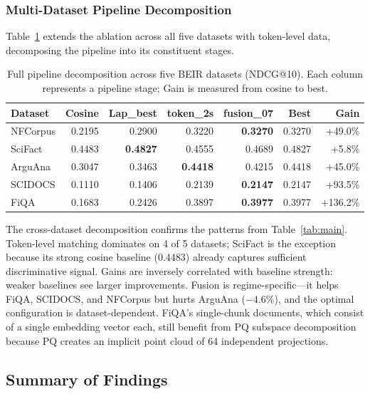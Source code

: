 \documentclass[review,1p]{elsarticle}
\begin{document}
\subsubsection{Multi-Dataset Pipeline Decomposition}
\label{subsubsec:multi-dataset}

Table~\ref{tab:decomposition} extends the ablation across all five datasets with token-level data, decomposing the pipeline into its constituent stages.

\begin{table}[ht]
\centering
\caption{Full pipeline decomposition across five BEIR datasets (NDCG@10). Each column represents a pipeline stage; Gain is measured from cosine to best.}
\label{tab:decomposition}
\begin{tabular}{lrrrrr|r}
\toprule
Dataset & Cosine & Lap\_best & token\_2s & fusion\_07 & \textbf{Best} & \textbf{Gain} \\
\midrule
NFCorpus & 0.2195 & 0.2900 & 0.3220 & \textbf{0.3270} & 0.3270 & +49.0\% \\
SciFact & 0.4483 & \textbf{0.4827} & 0.4555 & 0.4689 & 0.4827 & +5.8\% \\
ArguAna & 0.3047 & 0.3463 & \textbf{0.4418} & 0.4215 & 0.4418 & +45.0\% \\
SCIDOCS & 0.1110 & 0.1406 & 0.2139 & \textbf{0.2147} & 0.2147 & +93.5\% \\
FiQA & 0.1683 & 0.2426 & 0.3897 & \textbf{0.3977} & 0.3977 & +136.2\% \\
\bottomrule
\end{tabular}
\end{table}

The cross-dataset decomposition confirms the patterns from Table~\ref{tab:main}. Token-level matching dominates on 4 of 5 datasets; SciFact is the exception because its strong cosine baseline (0.4483) already captures sufficient discriminative signal. Gains are inversely correlated with baseline strength: weaker baselines see larger improvements. Fusion is regime-specific---it helps FiQA, SCIDOCS, and NFCorpus but hurts ArguAna ($-4.6\%$), and the optimal configuration is dataset-dependent. FiQA's single-chunk documents, which consist of a single embedding vector each, still benefit from PQ subspace decomposition because PQ creates an implicit point cloud of 64 independent projections.

\subsection{Summary of Findings}
\label{subsec:key-findings}
\end{document}
